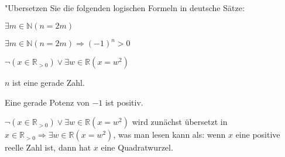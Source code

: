 "Ubersetzen Sie die folgenden logischen Formeln in deutsche Sätze:
\begin{teilaufgaben}
\item $\exists m\in\mathbb N (n=2m)$
\item $\exists m\in\mathbb N (n=2m)\Rightarrow (-1)^n > 0$
\item $\neg(x\in\mathbb R_{>0})\vee \exists w\in\mathbb R(x=w^2)$
\end{teilaufgaben}


\begin{loesung}
\begin{teilaufgaben}
\item $n$ ist eine gerade Zahl.
\item Eine gerade Potenz von $-1$ ist positiv.
\item $\neg (x\in\mathbb R_{>0})\vee \exists w\in\mathbb R(x=w^2)$ wird zunächst
übersetzt in
$x\in\mathbb R_{>0}\Rightarrow \exists w\in\mathbb R(x=w^2)$, was man lesen
kann als: wenn $x$ eine positive reelle Zahl ist, dann hat $x$ eine
Quadratwurzel.
\qedhere
\end{teilaufgaben}
\end{loesung}

